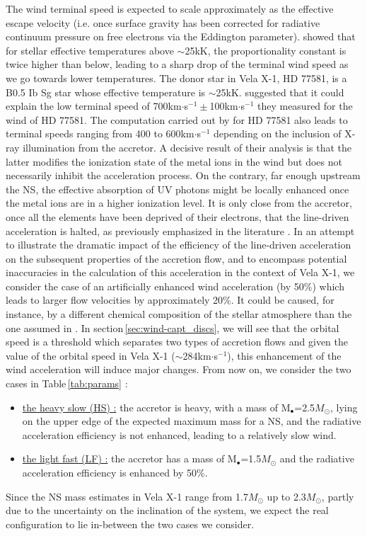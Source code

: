 \documentclass{aa}
\makeatletter
\newcommand*{\ns}{NS\@\xspace}
\newcommand*{\eg}{e.g.\@\xspace}
\newcommand*{\ie}{i.e.\@\xspace}
\newcommand*{\msun}{$M_{\odot}$\@\xspace}
\makeatother
\begin{document}
The wind terminal speed is expected to scale approximately as the effective escape velocity (\ie once surface gravity has been corrected for radiative continuum pressure on free electrons via the Eddington parameter). \cite{Vink2001} showed that for stellar effective temperatures above $\sim$25kK, the proportionality constant is twice higher than below, leading to a sharp drop of the terminal wind speed as we go towards lower temperatures. The donor star in Vela X-1, HD 77581, is a B0.5 Ib Sg star \citep{Hiltner1972,Forman1973} whose effective temperature is $\sim$25kK. \cite{Gimenez-Garcia2016} suggested that it could explain the low terminal speed of 700km$\cdot$s$^{-1}\pm$100km$\cdot$s$^{-1}$ they measured for the wind of HD 77581. The computation carried out by \cite{Sander2017} for HD 77581 also leads to terminal speeds ranging from 400 to 600km$\cdot$s$^{-1}$ depending on the inclusion of X-ray illumination from the accretor. A decisive result of their analysis is that the latter modifies the ionization state of the metal ions in the wind but does not necessarily inhibit the acceleration process. On the contrary, far enough upstream the \ns, the effective absorption of UV photons might be locally enhanced once the metal ions are in a higher ionization level. It is only close from the accretor, once all the elements have been deprived of their electrons, that the line-driven acceleration is halted, as previously emphasized in the literature \citep[see \eg][]{Hatchett1977,Ho1987,Blondin1990a,Karino2014}. In an attempt to illustrate the dramatic impact of the efficiency of the line-driven acceleration on the subsequent properties of the accretion flow, and to encompass potential inaccuracies in the calculation of this acceleration in the context of Vela X-1, we consider the case of an artificially enhanced wind acceleration (by 50\%) which leads to larger flow velocities by approximately 20\%. It could be caused, for instance, by a different chemical composition of the stellar atmosphere than the one assumed in \cite{Sander2017}. In section\,\ref{sec:wind-capt_discs}, we will see that the orbital speed is a threshold which separates two types of accretion flows and given the value of the orbital speed in Vela X-1 ($\sim$284km$\cdot$s$^{-1}$), this enhancement of the wind acceleration will induce major changes. From now on, we consider the two cases in Table\,\ref{tab:params} :
\begin{itemize}
\item \underline{the heavy slow (HS) :} the accretor is heavy, with a mass of M$_{\bullet}$=2.5\msun, lying on the upper edge of the expected maximum mass for a \ns, and the radiative acceleration efficiency is not enhanced, leading to a relatively slow wind.
\item  \underline{the light fast (LF) :} the accretor has a mass of M$_{\bullet}$=1.5\msun and the radiative acceleration efficiency is enhanced by 50\%.
\end{itemize} 
Since the \ns mass estimates in Vela X-1 range from 1.7\msun \citep{Rawls2011} up to 2.3\msun \citep{Quaintrell2003a}, partly due to the uncertainty on the inclination of the system, we expect the real configuration to lie in-between the two cases we consider.
\end{document}
